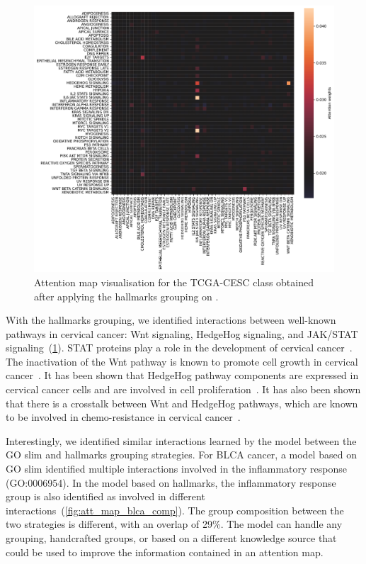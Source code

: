 \documentclass[../main.tex]{subfiles}
\begin{document}
	    \begin{figure}[htbp]
	        \centering
	        \includegraphics[width=\textwidth]{Beaude.168.fig.4.pdf}
	        \caption{Attention map visualisation for the TCGA-CESC class obtained after applying the hallmarks grouping on .}\label{fig:att_map_viz}
	    \end{figure}

	    With the hallmarks grouping, we identified interactions between well-known pathways in cervical cancer: Wnt signaling, HedgeHog signaling, and JAK/STAT signaling~(\cref{fig:att_map_viz}).
	    STAT proteins play a role in the development of cervical cancer~\cite{gutierrez-hoyaRoleJAKSTAT2020}.
	    The inactivation of the Wnt pathway is known to promote cell growth in cervical cancer~\cite{yangWntSignalingCervical2018}.
	    It has been shown that HedgeHog pathway components are expressed in cervical cancer cells and are involved in cell proliferation~\cite{samarzijaHedgehogPathwayRegulators2012}.
	    It has also been shown that there is a crosstalk between Wnt and HedgeHog pathways, which are known to be involved in chemo-resistance in cervical cancer~\cite{kumarRoleNotchHedgehog2021}.

	    Interestingly, we identified similar interactions learned by the model between the GO slim and hallmarks grouping strategies.
	    For BLCA cancer, a model based on GO slim identified multiple interactions involved in the inflammatory response (GO:0006954).
	    In the model based on hallmarks, the inflammatory response group is also identified as involved in different interactions~(\cref{fig:att_map_blca_comp}).
	    The group composition between the two strategies is different, with an overlap of 29\%.
	    The model can handle any grouping, handcrafted groups, or based on a different knowledge source that could be used to improve the information contained in an attention map.
\end{document}
